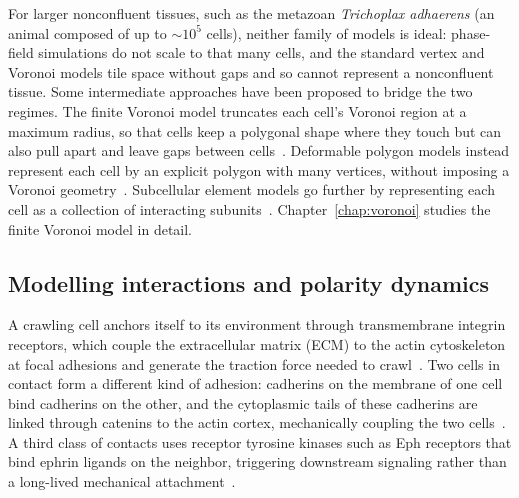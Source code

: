 For larger nonconfluent tissues, such as the metazoan \textit{Trichoplax adhaerens} (an animal composed of up to $\sim 10^5$ cells), neither family of models is ideal: phase-field simulations do not scale to that many cells, and the standard vertex and Voronoi models tile space without gaps and so cannot represent a nonconfluent tissue.
Some intermediate approaches have been proposed to bridge the two regimes.
The finite Voronoi model truncates each cell's Voronoi region at a maximum radius, so that cells keep a polygonal shape where they touch but can also pull apart and leave gaps between cells~\cite{graner1993can, teomy2018confluent, huang2023bridging}.
Deformable polygon models instead represent each cell by an explicit polygon with many vertices, without imposing a Voronoi geometry~\cite{boromand2018jamming, lv2024active}.
Subcellular element models go further by representing each cell as a collection of interacting subunits~\cite{sandersius2008modeling}.
Chapter~\ref{chap:voronoi} studies the finite Voronoi model in detail.


\subsection{Modelling interactions and polarity dynamics}
\label{sec:ch1:interactions}

A crawling cell anchors itself to its environment through transmembrane integrin receptors, which couple the extracellular matrix (ECM) to the actin cytoskeleton at focal adhesions and generate the traction force needed to crawl~\cite{parsons2010cell, ananthakrishnan2007forces}.
Two cells in contact form a different kind of adhesion: cadherins on the membrane of one cell bind cadherins on the other, and the cytoplasmic tails of these cadherins are linked through catenins to the actin cortex, mechanically coupling the two cells~\cite{noordstra2023cadherin, dufour2013alpha}.
A third class of contacts uses receptor tyrosine kinases such as Eph receptors that bind ephrin ligands on the neighbor, triggering downstream signaling rather than a long-lived mechanical attachment~\cite{larranaga2022ephrin, lin2015interplay}.

